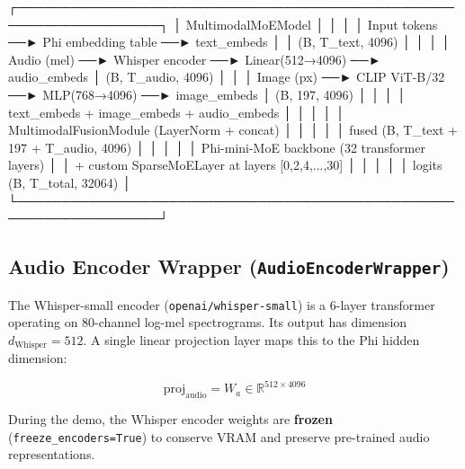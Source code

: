 \documentclass[11pt]{article}
\begin{document}
\begin{CodeBlock}
 ┌──────────────────────────────────────────────────────────────────┐
 │                    MultimodalMoEModel                            │
 │                                                                  │
 │  Input tokens ──► Phi embedding table ──► text_embeds            │
 │                                           (B, T_text, 4096)      │
 │                                                                  │
 │  Audio (mel) ──► Whisper encoder ──► Linear(512→4096) ──► audio_embeds
 │                                                     (B, T_audio, 4096)
 │                                                                  │
 │  Image (px) ──► CLIP ViT-B/32 ──► MLP(768→4096) ──► image_embeds
 │                                                   (B, 197, 4096) │
 │                                                                  │
 │         text_embeds + image_embeds + audio_embeds                │
 │                          │                                       │
 │          MultimodalFusionModule (LayerNorm + concat)             │
 │                          │                                       │
 │              fused  (B, T_text + 197 + T_audio, 4096)            │
 │                          │                                       │
 │         Phi-mini-MoE backbone (32 transformer layers)            │
 │         + custom SparseMoELayer at layers [0,2,4,...,30]         │
 │                          │                                       │
 │                    logits (B, T_total, 32064)                    │
 └──────────────────────────────────────────────────────────────────┘
\end{CodeBlock}


\subsection{Audio Encoder Wrapper (\texttt{AudioEncoderWrapper})}


The Whisper-small encoder (\texttt{openai/whisper-small}) is a 6-layer transformer operating on 80-channel log-mel spectrograms. Its output has dimension $d_{\text{Whisper}} = 512$. A single linear projection layer maps this to the Phi hidden dimension:


$$\text{proj}_{\text{audio}} = W_a \in \mathbb{R}^{512 \times 4096}$$


During the demo, the Whisper encoder weights are \textbf{frozen} (\texttt{freeze\_encoders=True}) to conserve VRAM and preserve pre-trained audio representations.
\end{document}
